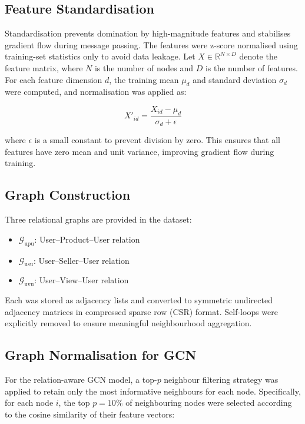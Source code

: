 \subsection{Feature Standardisation}
Standardisation prevents domination by high-magnitude features and stabilises gradient flow during message passing. The features were z-score normalised using training-set statistics only to avoid data leakage. Let \( X \in \mathbb{R}^{N \times D} \) denote the feature matrix, where \( N \) is the number of nodes and \( D \) is the number of features. For each feature dimension \( d \), the training mean \( \mu_d \) and standard deviation \( \sigma_d \) were computed, and normalisation was applied as:

\begin{equation}
X'_{id} = \frac{X_{id} - \mu_d}{\sigma_d + \epsilon}
\end{equation}

where \( \epsilon \) is a small constant to prevent division by zero. This ensures that all features have zero mean and unit variance, improving gradient flow during training.

\subsection{Graph Construction}
Three relational graphs are provided in the dataset:

\begin{itemize}
    \item \( \mathcal{G}_{\text{upu}} \): User--Product--User relation
    \item \( \mathcal{G}_{\text{usu}} \): User--Seller--User relation
    \item \( \mathcal{G}_{\text{uvu}} \): User--View--User relation
\end{itemize}

Each was stored as adjacency lists and converted to symmetric undirected adjacency matrices in compressed sparse row (CSR) format. Self-loops were explicitly removed to ensure meaningful neighbourhood aggregation.

\subsection{Graph Normalisation for GCN}
For the relation-aware GCN model, a top-\(p\) neighbour filtering strategy was applied to retain only the most informative neighbours for each node. Specifically, for each node \( i \), the top \( p = 10\% \) of neighbouring nodes were selected according to the cosine similarity of their feature vectors:

